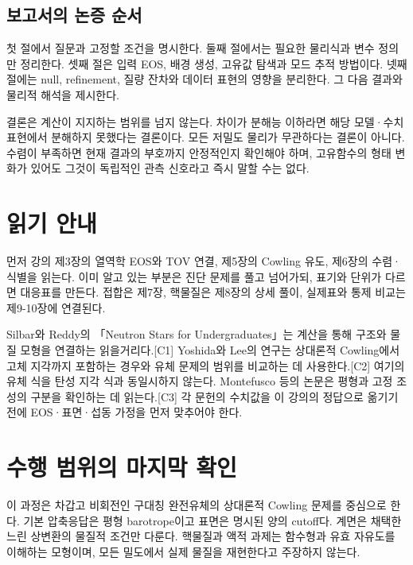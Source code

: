 \documentclass[
  10pt,
  a4paper,
]{article}
\begin{document}
\subsection{보고서의 논증
순서}\label{uxbcf4uxace0uxc11cuxc758-uxb17cuxc99d-uxc21cuxc11c}

첫 절에서 질문과 고정할 조건을 명시한다. 둘째 절에서는 필요한 물리식과
변수 정의만 정리한다. 셋째 절은 입력 EOS, 배경 생성, 고유값 탐색과 모드
추적 방법이다. 넷째 절에는 null, refinement, 질량 잔차와 데이터 표현의
영향을 분리한다. 그 다음 결과와 물리적 해석을 제시한다.

결론은 계산이 지지하는 범위를 넘지 않는다. 차이가 분해능 이하라면 해당
모델·수치 표현에서 분해하지 못했다는 결론이다. 모든 저밀도 물리가
무관하다는 결론이 아니다. 수렴이 부족하면 현재 결과의 부호까지
안정적인지 확인해야 하며, 고유함수의 형태 변화가 있어도 그것이 독립적인
관측 신호라고 즉시 말할 수는 없다.

\section{읽기 안내}\label{uxc77duxae30-uxc548uxb0b4}

먼저 강의 제3장의 열역학 EOS와 TOV 연결, 제5장의 Cowling 유도, 제6장의
수렴·식별을 읽는다. 이미 알고 있는 부분은 진단 문제를 풀고 넘어가되,
표기와 단위가 다르면 대응표를 만든다. 접합은 제7장, 핵물질은 제8장의
상세 풀이, 실제표와 통제 비교는 제9-10장에 연결된다.

Silbar와 Reddy의 「Neutron Stars for Undergraduates」는 계산을 통해
구조와 물질 모형을 연결하는 읽을거리다.{[}C1{]} Yoshida와 Lee의 연구는
상대론적 Cowling에서 고체 지각까지 포함하는 경우와 유체 문제의 범위를
비교하는 데 사용한다.{[}C2{]} 여기의 유체 식을 탄성 지각 식과 동일시하지
않는다. Montefusco 등의 논문은 평형과 고정 조성의 구분을 확인하는 데
읽는다.{[}C3{]} 각 문헌의 수치값을 이 강의의 정답으로 옮기기 전에
EOS·표면·섭동 가정을 먼저 맞추어야 한다.

\section{수행 범위의 마지막
확인}\label{uxc218uxd589-uxbc94uxc704uxc758-uxb9c8uxc9c0uxb9c9-uxd655uxc778}

이 과정은 차갑고 비회전인 구대칭 완전유체의 상대론적 Cowling 문제를
중심으로 한다. 기본 압축응답은 평형 barotrope이고 표면은 명시된 양의
cutoff다. 계면은 채택한 느린 상변환의 물질적 조건만 다룬다. 핵물질과
액적 과제는 함수형과 유효 자유도를 이해하는 모형이며, 모든 밀도에서 실제
물질을 재현한다고 주장하지 않는다.
\end{document}
